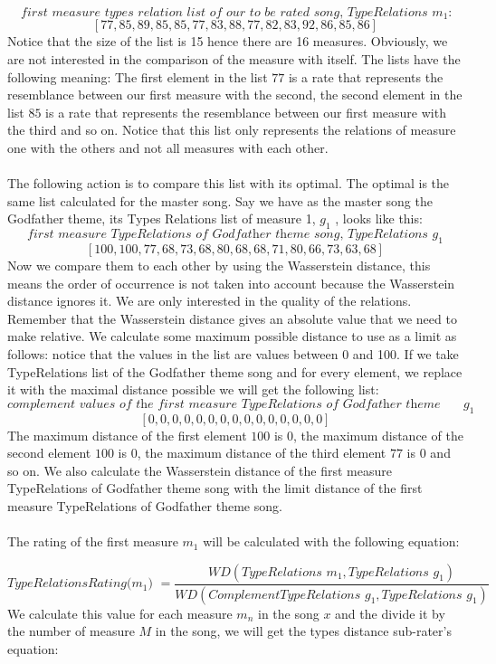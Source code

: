 \documentclass[a4paper]{article}
\begin{document}
\[\textit { first measure types relation list of our to be rated song, TypeRelations $m_1$}:\]
 \[[77, 85, 89, 85, 85, 77, 83, 88, 77, 82, 83, 92, 86, 85, 86]\]
Notice that the size of the list is 15 hence there are 16 measures. Obviously, we are not interested in the comparison of the measure with itself. The lists have the following meaning: The first element in the list $77$ is a rate that represents the resemblance between our first measure with the second, the second element in the list $85$ is a rate that represents the resemblance between our first measure with the third and so on. Notice that this list only represents the relations of measure one with the others and not all measures with each other.
\\\\
The following action is to compare this list with its optimal. The optimal is the same list calculated for the master song. Say we have as the master song the Godfather theme, its Types Relations list of measure 1,  $g_1$ , looks like this:
\[ \textit {first measure TypeRelations of Godfather theme song, TypeRelations $g_1$} \]
\[[100, 100, 77, 68, 73, 68, 80, 68, 68, 71, 80, 66, 73, 63, 68]\]
Now we compare them to each other by using the Wasserstein distance, this means the order of occurrence is not taken into account because the Wasserstein distance ignores it. We are only interested in the quality of the relations. Remember that the Wasserstein distance gives an absolute value that we need to make relative. We calculate some maximum possible distance to use as a limit as follows: notice that the values in the list are values between 0 and 100. If we take TypeRelations list of the Godfather theme song and for every element, we replace it with the maximal distance possible we will get the following list:
\[ \textit {complement values of the first measure TypeRelations of Godfather theme song, ComplementTypeRelations $g_1$} \]
\[[0, 0, 0, 0, 0, 0, 0, 0, 0, 0, 0, 0, 0, 0, 0]\]
The maximum distance of the first element $100$ is $0$, the maximum distance of the second element $100$ is $0$, the maximum distance of the third element $77$ is $0$ and so on. We also calculate the Wasserstein distance of the first measure TypeRelations of Godfather theme song with the limit distance of the first measure TypeRelations of Godfather theme song.
\\\\
The rating of the first measure $m_1$ will be calculated with the following equation:

\[ \textit{TypeRelationsRating($m_1$) } = 
\frac{WD(\textit{TypeRelations $m_1$},\textit{TypeRelations $g_1$})} {WD(\textit{ComplementTypeRelations $g_1$},\textit{TypeRelations $g_1$})} \]
We calculate this value for each measure $m_n$ in the song $x$ and the divide it by the number of measure $M$ in the song, we will get the types distance sub-rater's equation:
\end{document}
